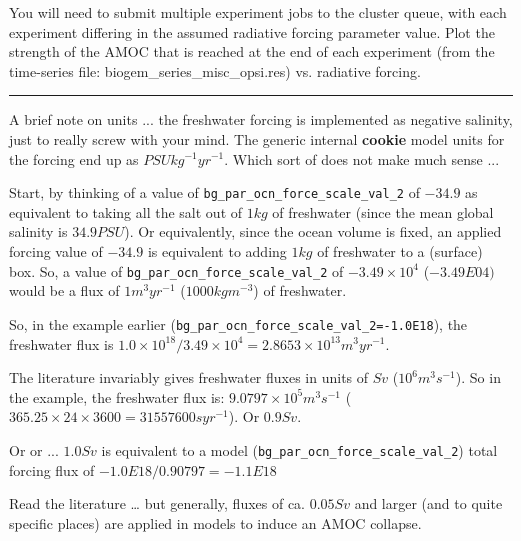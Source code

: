 You will need to submit multiple experiment jobs to the cluster queue, with each experiment differing in the assumed radiative forcing parameter value. Plot the strength of the AMOC that is reached at the end of each experiment (from the time-series file: \textsf{\footnotesize biogem\_series\_misc\_opsi.res}) vs. radiative forcing.

\vspace{1mm}\noindent\rule{4cm}{0.5pt}\vspace{2mm}

\newpage

A brief note on units ... the freshwater forcing is implemented as negative salinity, just to really screw with your mind. The generic internal \textbf{cookie} model units for the forcing end up as \(PSU kg^{-1} yr^{-1}\). Which sort of does not make much sense ...

Start, by thinking of a value of \texttt{bg\_par\_ocn\_force\_scale\_val\_2} of \(-34.9\) as equivalent to taking all the salt out of \(1 kg\) of freshwater (since the mean global salinity is \(34.9 PSU\)). Or equivalently, since the ocean volume is fixed, an applied forcing value of \(-34.9\) is equivalent to adding \(1 kg\) of freshwater to a (surface) box. So, a value of \texttt{bg\_par\_ocn\_force\_scale\_val\_2} of \(-3.49\times10^{4}\) (\(-3.49E04)\) would be a flux of \(1 m^{3} yr^{-1}\) (\(1000 kg m^{-3}\)) of freshwater.

So, in the example earlier (\texttt{bg\_par\_ocn\_force\_scale\_val\_2=-1.0E18}), the freshwater flux is \(1.0\times10^{18}/3.49\times10^{4} = 2.8653\times10^{13} m^{3} yr^{-1}\).

The literature invariably gives freshwater fluxes in units of \(Sv\) (\(10^{6} m^{3} s^{-1}\)). So in the example, the freshwater flux is: \(9.0797\times10^{5} m^{3} s^{-1}\) (\(365.25\times24\times3600 = 31557600 s yr^{-1}\)). Or \(0.9 Sv\).

Or or ... \(1.0 Sv\) is equivalent to a model (\texttt{bg\_par\_ocn\_force\_scale\_val\_2}) total forcing flux of \(-1.0E18/0.90797 = -1.1E18\)

Read the literature … but generally, fluxes of ca. \(0.05 Sv\) and larger (and to quite specific places) are applied in models to induce an AMOC collapse.

\newpage


